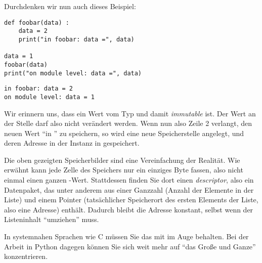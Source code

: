 {\begin{tcolorbox}[title=Speicherbild]
\begin{center}
\end{center}
\end{tcolorbox}
}

Durchdenken wir nun auch dieses Beispiel:
\begin{codebox}
\begin{verbatim}
def foobar(data) :
    data = 2
    print("in foobar: data =", data)

data = 1
foobar(data)
print("on module level: data =", data)
\end{verbatim}
\end{codebox}

\begin{cmdbox}
\begin{verbatim}
in foobar: data = 2
on module level: data = 1
\end{verbatim}
\end{cmdbox}

Wir erinnern uns, dass  ein Wert vom Typ  und damit \emph{immutable} ist. Der Wert an der Stelle  darf also nicht verändert werden. Wenn nun also Zeile 2 verlangt, den neuen Wert  \enquote{in } zu speichern, so wird eine neue Speicherstelle angelegt, und deren Adresse in der Instanz  in  gespeichert.

\begin{hintbox}
Die oben gezeigten Speicherbilder sind eine Vereinfachung der Realität. Wie erwähnt kann jede Zelle des Speichers nur ein einziges Byte fassen, also nicht einmal einen ganzen -Wert. Stattdessen finden Sie dort einen \emph{descriptor}, also ein Datenpaket, das unter anderem aus einer Ganzzahl (Anzahl der Elemente in der Liste) und einem Pointer (tatsächlicher Speicherort des ersten Elements der Liste, also eine Adresse) enthält. Dadurch bleibt die Adresse  konstant, selbst wenn der Listeninhalt \enquote{umziehen} muss.

In systemnahen Sprachen wie C müssen Sie das mit im Auge behalten. Bei der Arbeit in Python dagegen können Sie sich weit mehr auf \enquote{das Große und Ganze} konzentrieren.
\end{hintbox}

